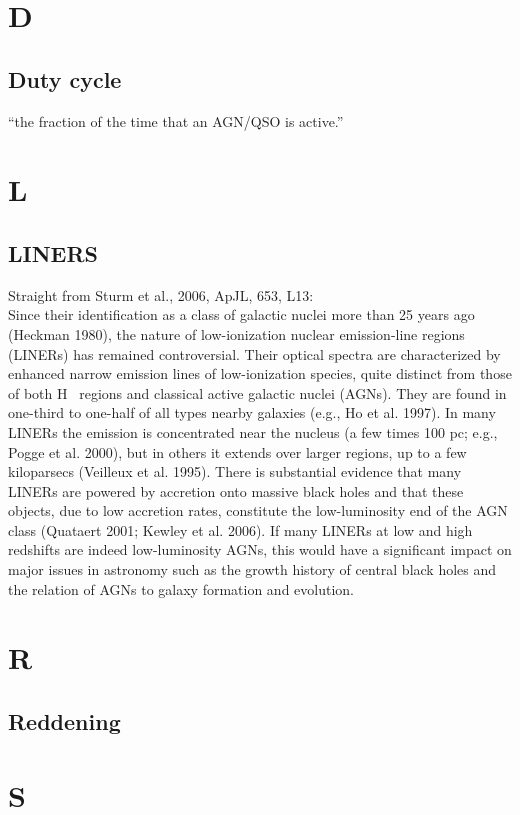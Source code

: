 \documentclass[11pt]{article}
\begin{document}
\section{D}
    \subsection{Duty cycle}
    ``the fraction of the time that an AGN/QSO is active.''


\section{L}
\subsection{LINERS}
Straight from Sturm et al., 2006, ApJL, 653, L13:\\
Since their identification as a class of galactic nuclei more than 25
years ago (Heckman 1980), the nature of low-ionization nuclear
emission-line regions (LINERs) has remained controversial. Their
optical spectra are characterized by enhanced narrow emission lines
of low-ionization species, quite distinct from those of both {H~} 
regions and classical active galactic nuclei (AGNs). They are found in
one-third to one-half of all types nearby galaxies (e.g., Ho et
al. 1997). In many LINERs the emission is concentrated near the
nucleus (a few times 100 pc; e.g., Pogge et al. 2000), but in others
it extends over larger regions, up to a few kiloparsecs (Veilleux et
al. 1995). There is substantial evidence that many LINERs are powered
by accretion onto massive black holes and that these objects, due to
low accretion rates, constitute the low-luminosity end of the AGN
class (Quataert 2001; Kewley et al. 2006). If many LINERs at low and
high redshifts are indeed low-luminosity AGNs, this would have a
significant impact on major issues in astronomy such as the growth
history of central black holes and the relation of AGNs to galaxy
formation and evolution.

\section{R}
\subsection{Reddening}

\section{S}
\end{document}

